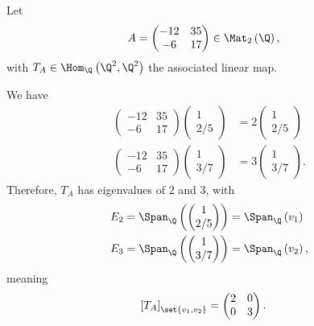 \documentclass[10pt]{mypackage}
\begin{document}
\begin{example}
  Let
  \begin{align*}
    A &= \begin{pmatrix}-12 & 35 \\ -6 & 17\end{pmatrix}\in \Mat_{2}\left(\Q\right),
  \end{align*}
  with $T_A \in \Hom_{\Q}\left(\Q^2,\Q^2\right)$ the associated linear map.\newline

  We have
  \begin{align*}
    \begin{pmatrix}-12 & 35 \\ -6 & 17\end{pmatrix} \begin{pmatrix}1\\2/5\end{pmatrix} &= 2 \begin{pmatrix}1\\2/5\end{pmatrix}\\
    \begin{pmatrix}-12 & 35 \\ -6 & 17\end{pmatrix} \begin{pmatrix}1\\3/7\end{pmatrix} &= 3 \begin{pmatrix}1\\3/7\end{pmatrix}.
  \end{align*}
  Therefore, $T_A$ has eigenvalues of $2$ and $3$, with
  \begin{align*}
    E_2 &= \Span_{\Q} \left(\begin{pmatrix}1\\2/5\end{pmatrix}\right) = \Span_{\Q}\left(v_1\right)\\
    E_3 &= \Span_{\Q}\left( \begin{pmatrix}1\\3/7\end{pmatrix}\right) = \Span_{\Q}\left(v_2\right),
  \end{align*}
  meaning
  \begin{align*}
    \left[T_{A}\right]_{\set{v_1,v_2}} &= \begin{pmatrix}2 & 0 \\ 0 & 3\end{pmatrix}.
  \end{align*}
\end{example}
\end{document}
